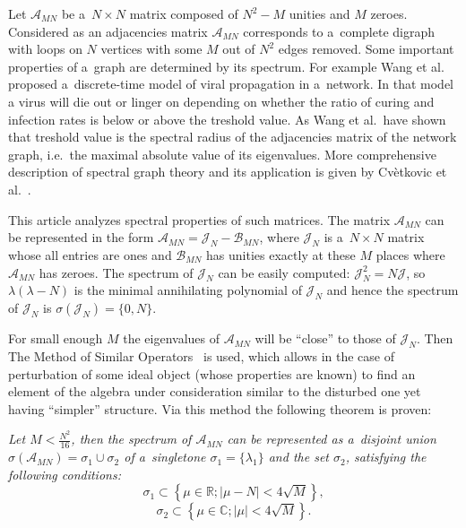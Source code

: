 Let \( \mathscr{A}_{MN} \) be a~\( N\times N \) matrix composed of
\( N^2 - M \) unities and \( M \) zeroes.
Considered as an adjacencies matrix \( \mathscr{A}_{MN} \)
corresponds to a~complete digraph with loops on \( N \) vertices
with some \( M \) out of \( N^2 \) edges removed.
Some important properties of a~graph are determined by its spectrum.
For example Wang et al.~\cite{wang2003epidemic,chakrabarti2008epidemic} proposed a~discrete-time model
of viral propagation in a~network.
In that model a virus will die out or linger on
depending on whether the ratio of curing and infection rates
is below or above the treshold value.
As Wang et al.\ have shown that treshold value
is the spectral radius of the adjacencies matrix of the network graph,
i.e.\ the maximal absolute value of its eigenvalues.
More comprehensive description of spectral graph theory
and its application is given by Cv\`etkovic et al.~\cite{cvetkovic1980spectra}.

This article analyzes spectral properties of such matrices.
The matrix \( \mathscr{A}_{MN} \) can be represented in the form
\( \mathscr{A}_{MN} = \mathcal{J}_N - \mathscr{B}_{MN} \),
where \( \mathcal{J}_N \) is a~\( N\times N \) matrix
whose all entries are ones
and \( \mathcal{B}_{MN} \) has unities exactly at these \( M \)
places where \( \mathscr{A}_{MN} \) has zeroes.
The spectrum of \( \mathcal{J}_N \) can be easily computed:
\( \mathcal{J}_N^2 = N \mathcal{J} \),
so \( \lambda(\lambda - N) \) is the minimal
annihilating polynomial of \( \mathcal{J}_N \)
and hence the spectrum of \( \mathcal{J}_{N} \) is
\( \sigma(\mathcal{J}_N) = \{ 0,N \} \).

For small enough \( M \) the eigenvalues of \( \mathscr{A}_{MN} \)
will be ``close'' to those of \( \mathcal{J}_N \).
Then The Method of Similar Operators~\cite{baskakov-harmonic,baskakov1983} is used,
which allows in the case of perturbation of some ideal object (whose properties are known)
to find an element of the algebra under consideration similar to the disturbed one
yet having ``simpler'' structure.
Via this method the following theorem is proven:
\begin{center}
\it
    Let \( M < \frac{N^2}{16} \),
    then the spectrum of \( \mathscr{A}_{MN} \) can be represented as a~disjoint union
    \( \sigma\left(\mathscr{A}_{MN}\right) = \sigma_1 \cup \sigma_2 \)
    of a~singletone \( \sigma_1=\{\lambda_1\} \)
    and the set \( \sigma_2 \), satisfying the following conditions:
    \[ \sigma_1 \subset \left\{ \mu\in\mathbb{R}; \lvert \mu - N \rvert < 4\sqrt{M} \right\}, \]
    \[ \sigma_2 \subset \left\{ \mu\in\mathbb{C}; \lvert \mu \rvert < 4\sqrt{M} \right\}. \]
\end{center}

